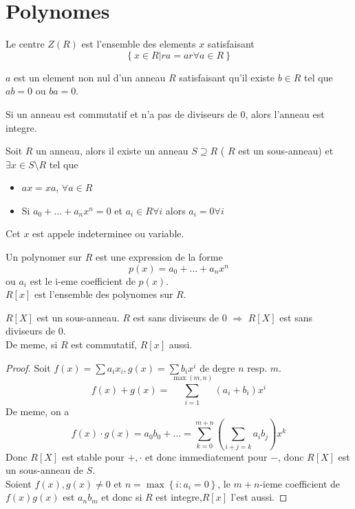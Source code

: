 \documentclass[../main.tex]{subfiles}
\begin{document}
\section{Polynomes}
\begin{defn}\label{defn:Centre d'un anneaucentre_d_un_anneau}
	Le centre $Z( R) $ est l'ensemble des elements $x$ satisfaisant
	\[ 
	\left\{ x \in R | ra = ar \forall a \in R \right\} 
	\]
	
\end{defn}
\begin{defn}[Diviseurs de 0]
	$a$ est un element non nul d'un anneau $R$ satisfaisant qu'il existe $b\in R$ tel que $ab=0$ ou  $ba=0$.

\end{defn}
\begin{defn}\label{defn:Anneau integreanneau_integre}
	Si un anneau est commutatif et n'a pas de diviseurs de 0, alors l'anneau est integre.
\end{defn}
\begin{thm}
	Soit $R$ un anneau, alors il existe un anneau $S \supseteq R$ ( $R$ est un sous-anneau) et $\exists x \in S \setminus R$ tel que 
	\begin{itemize}
		\item $ax=xa$, $\forall a \in R$ 
		\item Si $a_0 + \ldots + a_n x^{n} =0$ et $a_i \in R \forall i$ alors $a_i=0 \forall i$
	\end{itemize}
	Cet $x$ est appele indeterminee ou variable.
	
\end{thm}
\begin{defn}[Polynome]\label{defn:Polynomepolynome}
	Un polynomer sur $R$ est une expression de la forme
	\[ 
		p( x) = a_0 + \ldots + a_n x^{n}
	\]
	ou $a_i$ est le i-eme coefficient de $p( x)$.\\
	$ R[x]$ est l'ensemble des polynomes sur $R$.
\end{defn}
\begin{thm}
	$R[X]$ est un sous-anneau.  $R$ est sans diviseurs de $0$ $\Rightarrow$ $R[X]$ est sans diviseurs de 0.\\
	De meme, si $R$ est commutatif, $R[x]$ aussi.
\end{thm}
\begin{proof}
	Soit $f( x) = \sum a_i x_i, g( x ) = \sum b_i x^{i} $ de degre $n$ resp. $m$.
	\[ 
		f( x) + g( x) = \sum_{i=1}^{ \max( m,n) }( a_i +b_i) x^{i}
	\]
De meme, on a
\[ 
	f( x) \cdot g( x) = a_0b_0 + \ldots = \sum_{k=0}^{m+n} \left( \sum_{i+j=k} a_i b_j \right) x^{k}
\]
Donc $R[X]$ est stable pour $+,\cdot$ et donc immediatement pour $-$, donc $R[X]$ est un sous-anneau de $S$.\\
Soient $f( x) ,g( x) \neq 0$ et $n=\max \left\{ i:a_i=0 \right\} $, le $m+n$-ieme coefficient de $f( x) g( x) $ est $a_n b_m$ et donc si  $R$ est integre,$R[x]$ l'est aussi.
\end{proof}
\end{document}
